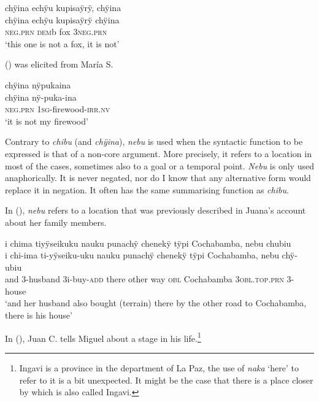 \ea\label{ex:chibu-13second}
\begingl
\glpreamble chÿina echÿu kupisaÿrÿ, chÿina\\
\gla chÿina echÿu kupisaÿrÿ chÿina\\
\textsc{neg.prn} \textsc{dem}b fox 3\textsc{neg.prn}\\
\glft ‘this one is not a fox, it is not’
\endgl
\trailingcitation{[dxx-d120416s.021]}
\xe

() was elicited from María S.

\ea\label{ex:chibu-14}
\begingl
\glpreamble chÿina nÿpukaina\\
\gla chÿina nÿ-puka-ina\\
\textsc{neg.prn} 1\textsc{sg}-firewood-\textsc{irr.nv}\\
\glft ‘it is not my firewood’
\endgl
\trailingcitation{[rxx-e201231f.09]}
\xe
{}

Contrary to \textit{chibu} (and \textit{chÿina}), \textit{nebu} is used when the syntactic function to be expressed is that of a non-core argument. More precisely, it refers to a location in most of the cases, sometimes also to a goal or a temporal point. \textit{Nebu} is only used anaphorically. It is never negated, nor do I know that any alternative form would replace it in negation. It often has the same summarising function as \textit{chibu}.

In (), \textit{nebu} refers to a location that was previously described in Juana’s account about her family members.



\ea\label{ex:nebu-1}
\begingl
\glpreamble i chima tiyÿseikuku nauku punachÿ chenekÿ tÿpi Cochabamba, nebu chubiu\\
\gla i chi-ima ti-yÿseiku-uku nauku punachÿ chenekÿ tÿpi Cochabamba, nebu chÿ-ubiu\\
\glb and 3-husband 3i-buy-\textsc{add} there other way \textsc{obl} Cochabamba 3\textsc{obl.top.prn} 3-house\\
\glft ‘and her husband also bought (terrain) there by the other road to Cochabamba, there is his house’
\endgl
\trailingcitation{[jxx-p120430l-1.407-409]}
\xe

In (), Juan C. tells Miguel about a stage in his life.\footnote{Ingavi is a province in the department of La Paz, the use of \textit{naka} ‘here’ to refer to it is a bit unexpected. It might be the case that there is a place closer by which is also called Ingavi.}

